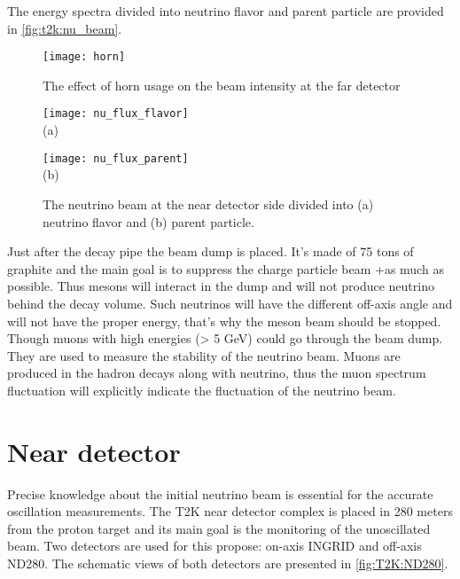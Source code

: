 \documentclass[../main.tex]{subfiles}
\begin{document}
The energy spectra divided into neutrino flavor and parent particle are provided in \autoref{fig:t2k:nu_beam}.

\begin{figure}[!ht]
  \centering
  \begin{minipage}{0.32\linewidth}
    \centering
    \texttt{[image: horn]}
    \caption{The effect of horn usage on the beam intensity at the far detector}
    \label{fig:t2k:horn}
  \end{minipage}
  \begin{minipage}{0.66\linewidth}
    \centering
    \begin{minipage}{0.49\linewidth}
    \centering
      \texttt{[image: nu\_flux\_flavor]} \\ (a)
    \end{minipage}
    \begin{minipage}{0.49\linewidth}
    \centering
      \texttt{[image: nu\_flux\_parent]} \\ (b)
    \end{minipage}
    \caption{The neutrino beam at the near detector side divided into (a) neutrino flavor and (b) parent particle.}
    \label{fig:t2k:nu_beam}
  \end{minipage}
\end{figure}

Just after the decay pipe the beam dump is placed. It's made of 75 tons of graphite and the main goal is to suppress the charge particle beam +as much as possible. Thus mesons will interact in the dump and will not produce neutrino behind the decay volume. Such neutrinos will have the different off-axis angle and will not have the proper energy, that's why the meson beam should be stopped. Though muons with high energies (> 5 GeV) could go through the beam dump. They are used to measure the stability of the neutrino beam. Muons are produced in the hadron decays along with neutrino, thus the muon spectrum fluctuation will explicitly indicate the fluctuation of the neutrino beam.

\section{Near detector}
\label{ch:T2K:nd}
Precise knowledge about the initial neutrino beam is essential for the accurate oscillation measurements. The T2K near detector complex is placed in 280 meters from the proton target and its main goal is the monitoring of the unoscillated beam. Two detectors are used for this propose: on-axis INGRID and off-axis ND280. The schematic views of both detectors are presented in \autoref{fig:T2K:ND280}.
\end{document}
